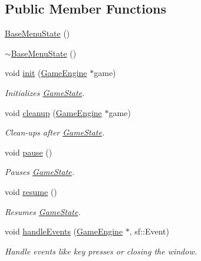 \subsection*{Public Member Functions}
\begin{DoxyCompactItemize}
\item 
\mbox{\hyperlink{class_base_menu_state_aad9bd5a7fda48fc3dd9c1d6b22c707f7}{Base\+Menu\+State}} ()
\item 
\mbox{\hyperlink{class_base_menu_state_ae6c9f9087edfc4d738a1f42a6c77d170}{$\sim$\+Base\+Menu\+State}} ()
\item 
void \mbox{\hyperlink{class_base_menu_state_ae29d522c56a4582ce79e113426421741}{init}} (\mbox{\hyperlink{class_game_engine}{Game\+Engine}} $\ast$game)
\begin{DoxyCompactList}\small\item\em Initializes \mbox{\hyperlink{class_game_state}{Game\+State}}. \end{DoxyCompactList}\item 
void \mbox{\hyperlink{class_base_menu_state_a6ca2a29b45a0c2d6d2cbbb6ee67d38ac}{cleanup}} (\mbox{\hyperlink{class_game_engine}{Game\+Engine}} $\ast$game)
\begin{DoxyCompactList}\small\item\em Clean-\/ups after \mbox{\hyperlink{class_game_state}{Game\+State}}. \end{DoxyCompactList}\item 
void \mbox{\hyperlink{class_base_menu_state_a3ac8e688220c609b467ca4ae4c6600d6}{pause}} ()
\begin{DoxyCompactList}\small\item\em Pauses \mbox{\hyperlink{class_game_state}{Game\+State}}. \end{DoxyCompactList}\item 
void \mbox{\hyperlink{class_base_menu_state_a8b0bba27d448b83a1f8f4ceca8dde07e}{resume}} ()
\begin{DoxyCompactList}\small\item\em Resumes \mbox{\hyperlink{class_game_state}{Game\+State}}. \end{DoxyCompactList}\item 
void \mbox{\hyperlink{class_base_menu_state_af593c53bcd111bd210b933ddb360f509}{handle\+Events}} (\mbox{\hyperlink{class_game_engine}{Game\+Engine}} $\ast$, sf\+::\+Event)
\begin{DoxyCompactList}\small\item\em Handle events like key presses or closing the window. \end{DoxyCompactList}\item 

\end{DoxyCompactItemize}
